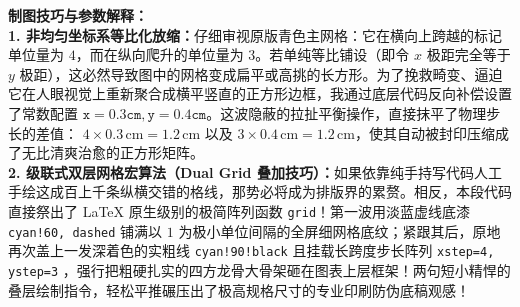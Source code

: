 \vspace{0.6cm}

{\small\color{blue!70!black}
\textbf{制图技巧与参数解释：}\\
\textbf{1. 非均匀坐标系等比化放缩：}仔细审视原版青色主网格：它在横向上跨越的标记单位量为 $4$，而在纵向爬升的单位量为 $3$。若单纯等比铺设（即令 $x$ 极距完全等于 $y$ 极距），这必然导致图中的网格变成扁平或高挑的长方形。为了挽救畸变、逼迫它在人眼视觉上重新聚合成横平竖直的正方形边框，我通过底层代码反向补偿设置了常数配置 $\mathtt{x=0.3cm, y=0.4cm}$。这波隐蔽的拉扯平衡操作，直接抹平了物理步长的差值： $4 \times 0.3\,\text{cm} = 1.2\,\text{cm}$ 以及 $3 \times 0.4\,\text{cm} = 1.2\,\text{cm}$，使其自动被封印压缩成了无比清爽治愈的正方形矩阵。\\
\textbf{2. 级联式双层网格宏算法（Dual Grid 叠加技巧）：}如果依靠纯手持写代码人工手绘这成百上千条纵横交错的格线，那势必将成为排版界的累赘。相反，本段代码直接祭出了 LaTeX 原生级别的极简阵列函数 \texttt{grid}！第一波用淡蓝虚线底漆 \texttt{cyan!60, dashed} 铺满以 $1$ 为极小单位间隔的全屏细网格底纹；紧跟其后，原地再次盖上一发深着色的实粗线 \texttt{cyan!90!black} 且挂载长跨度步长阵列 \texttt{xstep=4, ystep=3} ，强行把粗硬扎实的四方龙骨大骨架砸在图表上层框架！两句短小精悍的叠层绘制指令，轻松平推碾压出了极高规格尺寸的专业印刷防伪底稿观感！
}
